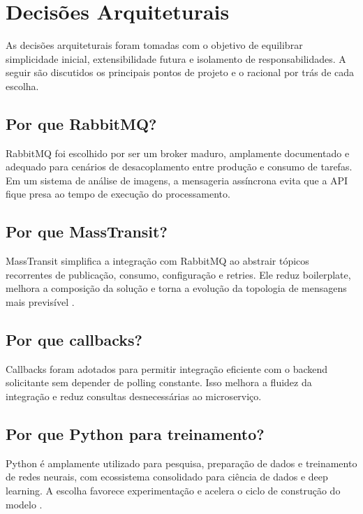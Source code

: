 \chapter{Decisões Arquiteturais}

As decisões arquiteturais foram tomadas com o objetivo de equilibrar simplicidade inicial, extensibilidade futura e isolamento de responsabilidades. A seguir são discutidos os principais pontos de projeto e o racional por trás de cada escolha.

\section{Por que RabbitMQ?}

RabbitMQ foi escolhido por ser um broker maduro, amplamente documentado e adequado para cenários de desacoplamento entre produção e consumo de tarefas. Em um sistema de análise de imagens, a mensageria assíncrona evita que a API fique presa ao tempo de execução do processamento.

\section{Por que MassTransit?}

MassTransit simplifica a integração com RabbitMQ ao abstrair tópicos recorrentes de publicação, consumo, configuração e retries. Ele reduz boilerplate, melhora a composição da solução e torna a evolução da topologia de mensagens mais previsível \cite{masstransitdocs}.

\section{Por que callbacks?}

Callbacks foram adotados para permitir integração eficiente com o backend solicitante sem depender de polling constante. Isso melhora a fluidez da integração e reduz consultas desnecessárias ao microserviço.

\section{Por que Python para treinamento?}

Python é amplamente utilizado para pesquisa, preparação de dados e treinamento de redes neurais, com ecossistema consolidado para ciência de dados e deep learning. A escolha favorece experimentação e acelera o ciclo de construção do modelo \cite{pytorchdocs}.

